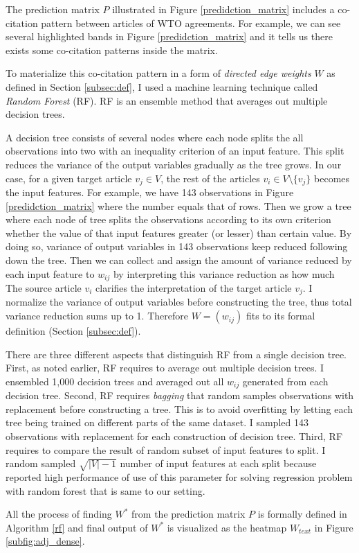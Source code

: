 The prediction matrix $P$ illustrated in Figure \ref{predidction_matrix}
includes a co-citation pattern between articles of WTO agreements. For example,
we can see several highlighted bands in Figure \ref{predidction_matrix}
and it tells us there exists some co-citation patterns inside the matrix.
 
To materialize this co-citation pattern in a form of \textit{directed edge weights} $W$ as defined in Section \ref{subsec:def},
I used a machine learning technique called \textit{Random Forest} (RF). RF is an ensemble method that averages out
multiple decision trees.
 
A decision tree consists of several nodes where each node splits the all observations into two with an inequality criterion of an input feature.
This split reduces the variance of the output variables gradually as the tree grows.
In our case, for a given target article $v_j \in V$, the rest of the articles $v_i \in V \setminus \{v_j\}$ becomes the input features.
For example, we have 143 observations in Figure \ref{predidction_matrix} where the number equals that of rows.
Then we grow a tree where each node of tree splits
the observations according to its own criterion
whether the value of that input features greater (or lesser) than certain value.
By doing so,
variance of output variables in 143 observations keep reduced following down the tree.
Then we can collect and assign the amount of variance reduced by each input feature to $w_{ij}$
by interpreting this variance reduction as how much
The source article $v_i$ clarifies the interpretation of the target article $v_j$.
I normalize the variance of output variables before constructing the tree, thus total variance reduction
sums up to 1. Therefore $W = (w_{ij})$ fits to its formal definition (Section \ref{subsec:def}).
 
There are three different aspects that distinguish RF from a single decision tree.
First, as noted earlier, RF requires to average out multiple decision trees.
I ensembled 1,000 decision trees and averaged out all $w_{ij}$ generated from each decision tree.
Second, RF requires \textit{bagging} that random samples observations with replacement before constructing a tree.
This is to avoid overfitting by letting each tree being trained on different parts of the same dataset.
I sampled 143 observations with replacement for each construction of decision tree.
Third, RF requires to compare the result of random subset of input features to split.
I random sampled $\sqrt{|V|-1}$ number of input features at each split because \cite{genie3} reported high performance of use of this parameter for solving regression problem with random forest that is same to our setting.
 
All the process of finding $W^*$ from the prediction matrix $P$ is formally defined in Algorithm \ref{rf} and final output of $W^*$ is visualized as the heatmap $W_{text}$ in Figure \ref{subfig:adj_dense}.
